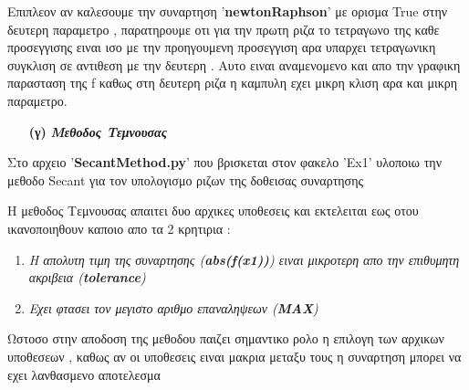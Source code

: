 \documentclass[a4paper,11pt]{article}
\begin{document}
	\begin{center}
		Επιπλεον αν καλεσουμε την συναρτηση '\textbf{newtonRaphson}' με ορισμα True στην δευτερη παραμετρο , παρατηρουμε οτι για την πρωτη ριζα το τετραγωνο της καθε προσεγγισης ειναι ισο με την προηγουμενη προσεγγιση αρα υπαρχει τετραγωνικη συγκλιση σε αντιθεση με την δευτερη . Αυτο ειναι αναμενομενο και απο την γραφικη παρασταση της f καθως στη δευτερη ριζα η καμπυλη εχει μικρη κλιση αρα και μικρη παραμετρο.  
	\end{center}
		
\vspace{1cm}
	\begin{enumerate}
		\item[\textbf{(γ)}] \emph {\textbf{Μεθοδος Τεμνουσας}}
	\end{enumerate}
	\begin{center}
		Στο αρχειο '\textbf{SecantMethod.py}' που βρισκεται στον φακελο 'Ex1' υλοποιω την μεθοδο Secant για τον υπολογισμο ριζων της δοθεισας συναρτησης 
	\end{center}
	\begin{center}
		Η μεθοδος Τεμνουσας απαιτει δυο αρχικες υποθεσεις και εκτελειται εως οτου ικανοποιηθουν καποιο απο τα 2 κρητιρια :  
	\end{center}
	\begin{enumerate}
		\item {\emph{Η απολυτη τιμη της συναρτησης (\textbf{abs(f(x1))}) ειναι μικροτερη απο την επιθυμητη ακριβεια (\textbf{tolerance})  }}
		\item {\emph{Εχει φτασει τον μεγιστο αριθμο επαναληψεων (\textbf{MAX})}}		
	\end{enumerate}
	\begin{center}
		Ωστοσο στην αποδοση της μεθοδου παιζει σημαντικο ρολο η επιλογη των αρχικων υποθεσεων , καθως αν οι υποθεσεις ειναι μακρια μεταξυ τους η συναρτηση μπορει να εχει λανθασμενο αποτελεσμα
	\end{center}
	
\end{document}
